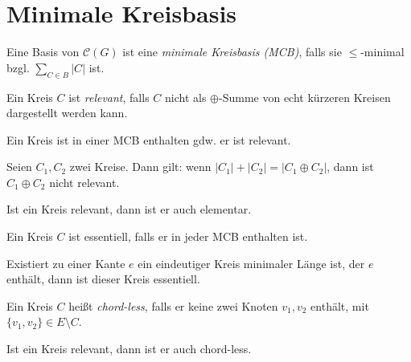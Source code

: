 \section{Minimale Kreisbasis}

\begin{definition}
    Eine Basis von $ \mathcal{C}(G) $ ist eine \textit{minimale Kreisbasis (MCB)}, falls sie $ \leq $-minimal bzgl. $ \sum_{C \in B} |C| $ ist.
\end{definition}

\begin{definition}[Relevant]
    Ein Kreis $ C $ ist \textit{relevant}, falls $ C $ nicht als $ \oplus $-Summe von echt kürzeren Kreisen dargestellt werden kann.

\end{definition}

\begin{proposition}
    Ein Kreis ist in einer MCB enthalten gdw. er ist relevant.
\end{proposition}

\begin{proposition}
    Seien $ C_1, C_2 $ zwei Kreise.
    Dann gilt: wenn $ |C_1| + |C_2| = |C_1 \oplus C_2| $, dann ist $ C_1 \oplus C_2 $ nicht relevant.
\end{proposition}

\begin{proposition}
    Ist ein Kreis relevant, dann ist er auch elementar.
\end{proposition}

\begin{definition}[Essentiell]
    Ein Kreis $ C $ ist essentiell, falls er in jeder MCB enthalten ist.
\end{definition}

\begin{proposition}
    Existiert zu einer Kante $ e $ ein eindeutiger Kreis minimaler Länge ist, der $ e $ enthält, dann ist dieser Kreis essentiell.
\end{proposition}

\begin{definition}
    Ein Kreis $ C $ heißt \textit{chord-less}, falls er keine zwei Knoten $ v_1, v_2 $ enthält, mit $ \{ v_1, v_2 \} \in E \setminus C $.
\end{definition}

\begin{proposition}
    Ist ein Kreis relevant, dann ist er auch chord-less.
\end{proposition}

